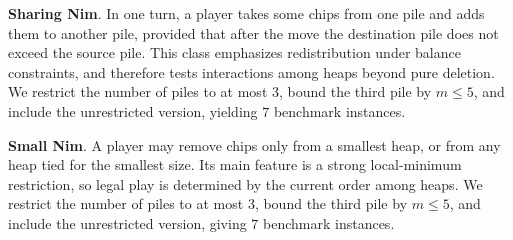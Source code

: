 \documentclass[review]{elsarticle}
\newcommand{\set}[1]{\{ #1 \}}
\newcommand{\tuple}[1]{\langle {#1} \rangle}
\newcommand{\true}{\top}
\newcommand{\statevar}{\mathcal{X}}
\newcommand{\act}{\mathcal{A}}
\newcommand{\constraint}{\mathcal{C}}
\newcommand{\estate}{\mathcal{E}}
\newcommand{\pre}{\mathtt{pre}}
\newcommand{\eff}{\mathtt{eff}}
\begin{document}
\textbf{Sharing Nim}. In one turn, a player takes some chips from one pile and adds them to another pile, provided that after the move the destination pile does not exceed the source pile.
This class emphasizes redistribution under balance constraints, and therefore tests interactions among heaps beyond pure deletion.
We restrict the number of piles to at most $3$, bound the third pile by $m \le 5$, and include the unrestricted version, yielding $7$ benchmark instances.

\textbf{Small Nim}. A player may remove chips only from a smallest heap, or from any heap tied for the smallest size.
Its main feature is a strong local-minimum restriction, so legal play is determined by the current order among heaps.
We restrict the number of piles to at most $3$, bound the third pile by $m \le 5$, and include the unrestricted version, giving $7$ benchmark instances.
\end{document}
